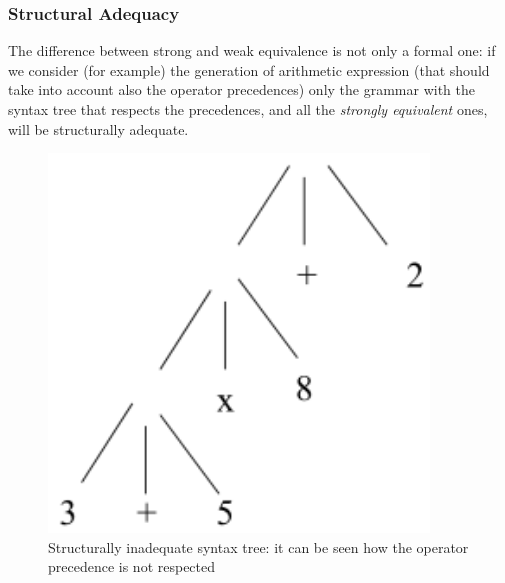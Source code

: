 \documentclass[10pt,a4paper]{article}
\begin{document}
			\subsubsection{Structural Adequacy}
				The difference between strong and weak equivalence is not only a formal one: if we consider (for example) the generation of arithmetic expression (that should take into account also the operator precedences) only the grammar with the syntax tree that respects the precedences, and all the \emph{strongly equivalent} ones, will be structurally adequate.\\
					\begin{figure}
						\centering
						\begin{minipage}{0.45\textwidth}
							\centering
							\includegraphics[width=0.9\textwidth]{./images/structAdeq1.png}
					    	\caption{Structurally inadequate syntax tree: it can be seen how the operator precedence is not respected}
						\end{minipage}\hfill
						\begin{minipage}{0.45\textwidth}
							\centering

\end{minipage}
\end{figure}
\end{document}
